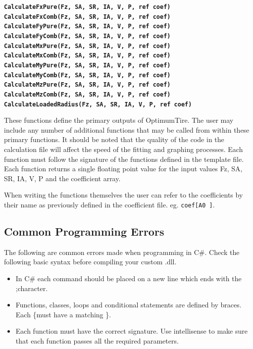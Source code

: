 \begin{center}
\texttt{\textbf{CalculateFxPure(Fz, SA, SR, IA, V, P, ref coef)\\
	        CalculateFxComb(Fz, SA, SR, IA, V, P, ref coef)\\
	        CalculateFyPure(Fz, SA, SR, IA, V, P, ref coef)\\
	        CalculateFyComb(Fz, SA, SR, IA, V, P, ref coef)\\
	        CalculateMxPure(Fz, SA, SR, IA, V, P, ref coef)\\
	        CalculateMxComb(Fz, SA, SR, IA, V, P, ref coef)\\
	        CalculateMyPure(Fz, SA, SR, IA, V, P, ref coef)\\
	        CalculateMyComb(Fz, SA, SR, IA, V, P, ref coef)\\
	        CalculateMzPure(Fz, SA, SR, IA, V, P, ref coef)\\
	        CalculateMzComb(Fz, SA, SR, IA, V, P, ref coef)\\
	        CalculateLoadedRadius(Fz, SA, SR, IA, V, P, ref coef)}}
\end{center}

    
These functions define the primary outputs of OptimumTire. The user may include any number of additional functions that may be called from within these primary functions. It should be noted that the quality of the code in the calculation file will affect the speed of the fitting and graphing processes.
Each function must follow the signature of the functions defined in the template file. Each function returns a single floating point value for the input values Fz, SA, SR, IA, V, P and the coefficient array.

When writing the functions themselves the user can refer to the coefficients by their name as previously defined in the coefficient file. eg. {\tt coef[\textquotedbl A0 \textquotedbl]}. 

\subsection{Common Programming Errors}
\label{sec:Common Programming Errors}
The following are common errors made when programming in C\#. Check the following basic syntax before compiling your custom .dll.

\begin{itemize}
	\item In C\# each command should be placed on a new line which ends with the \textquotedbl ;\textquotedbl character.

\item Functions, classes, loops and conditional statements are defined by braces. Each \textquotedbl \{\textquotedbl must have a matching  \textquotedbl \}\textquotedbl.

\item Each function must have the correct signature. Use intellisense to make sure that each function passes all the required parameters.
\end{itemize}

